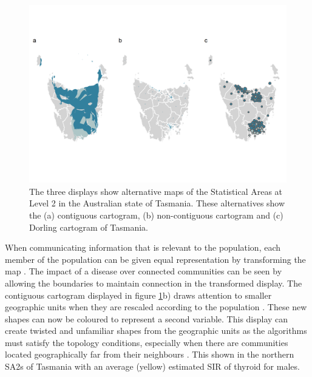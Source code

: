 \begin{Schunk}
\begin{figure}
\includegraphics[width=0.95\linewidth]{kobakian-cook_files/figure-latex/tas_displays-1} \caption[The three displays show alternative maps of the Statistical Areas at Level 2 in the Australian state of Tasmania]{The three displays show alternative maps of the Statistical Areas at Level 2 in the Australian state of Tasmania. These alternatives show the (a) contiguous cartogram, (b) non-contiguous cartogram and (c) Dorling cartogram of Tasmania.}\label{fig:tas_displays}
\end{figure}
\end{Schunk}

When communicating information that is relevant to the population, each
member of the population can be given equal representation by
transforming the map \citep{TVSSS}. The impact of a disease over
connected communities can be seen by allowing the boundaries to maintain
connection in the transformed display. The contiguous cartogram
displayed in figure \ref{fig:tas_displays}b) draws attention to smaller
geographic units when they are rescaled according to the population
\citep{DMAHP}. These new shapes can now be coloured to represent a
second variable. This display can create twisted and unfamiliar shapes
from the geographic units as the algorithms must satisfy the topology
conditions, especially when there are communities located geographically
far from their neighbours \citep{TVSSS}. This shown in the northern SA2s
of Tasmania with an average (yellow) estimated SIR of thyroid for males.

